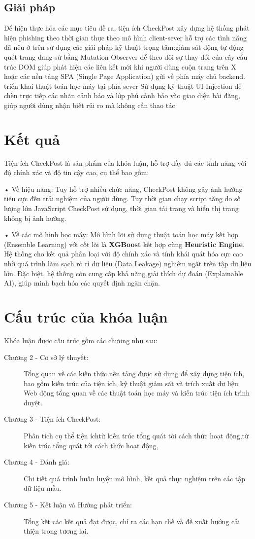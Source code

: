 \subsection{Giải pháp}

    Để hiện thực hóa các mục tiêu đề ra, tiện ích CheckPost xây dựng hệ thống phát hiện phishing theo thời gian thực theo mô hình client-sever hỗ trợ các tình năng đã nêu ở trên sử dụng các giải pháp kỹ thuật trọng tâm:giám sát động tự động quét trang đang sử bằng Mutation Observer để theo dõi sự thay đổi của cây cấu trúc DOM giúp phát hiện các liên kết mới khi người dùng cuộn trang trên X hoặc các nền tảng SPA (Single Page Application) gửi về phía máy chủ backend. triển khai thuật toán học máy tại phía sever Sử dụng kỹ thuật UI Injection để chèn trực tiếp các nhãn cảnh báo và lớp phủ cảnh bảo vào giao diện bài đăng, giúp người dùng nhận biết rủi ro mà không cần thao tác
\section{Kết quả}
Tiện ích CheckPost là sản phẩm của khóa luận, hỗ trợ đầy đủ các tính năng
 với độ chính xác và độ tin cậy cao, cụ thể bao gồm:
 
• Về hiệu năng: Tuy hỗ trợ nhiều chức năng, CheckPost không gây ảnh
hưởng tiêu cực đến trải nghiệm của người dùng. Tuy thời gian chạy script
tăng do số lượng lớn JavaScript CheckPost sử dụng, thời gian tải trang và
hiển thị trang không bị ảnh hưởng.

• Về các mô hình học máy: Mô hình lõi sử dụng thuật toán học máy kết hợp (Ensemble Learning) với cốt lõi là \textbf{XGBoost} kết hợp cùng \textbf{Heuristic Engine}. Hệ thống cho kết quả phân loại với độ chính xác và tính khái quát hóa cực cao nhờ quá trình làm sạch rò rỉ dữ liệu (Data Leakage) nghiêm ngặt trên tập dữ liệu lớn. Đặc biệt, hệ thống còn cung cấp khả năng giải thích dự đoán (Explainable AI), giúp minh bạch hóa các quyết định ngăn chặn.
\section{Cấu trúc của khóa luận}
\label{sec:cau-truc-kl}

Khóa luận được cấu trúc gồm các chương như sau:

\begin{description}
    \item[Chương 2 - Cơ sở lý thuyết:] Tổng quan về các kiến thức nền tảng được
sử dụng để xây dựng tiện ích, bao gồm kiến trúc của tiện ích, kỹ thuật giám sát và trích xuất dữ liệu Web động tổng quan về các thuật toán học máy và kiến trúc tiện ích trình duyệt.
    \item[Chương 3 - Tiện ích CheckPost:] Phân tích cụ thể tiện íchtừ kiến trúc tổng quát tới cách thức hoạt động,từ kiến trúc tổng quát tới cách thức hoạt động,
    \item[Chương 4 - Đánh giá:] Chi tiết quá trình huấn luyện mô hình, kết quả thực nghiệm trên các tập dữ liệu mẫu.
    \item[Chương 5 - Kết luận và Hướng phát triển:] Tổng kết các kết quả đạt được, chỉ ra các hạn chế và đề xuất hướng cải thiện trong tương lai.
\end{description}